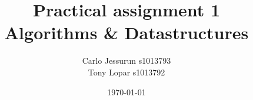 \documentclass{article}
\begin{document}
\title{Practical assignment 1 \\ Algorithms \& Datastructures}
\author{Carlo Jessurun s1013793 \\ Tony Lopar s1013792}
\date{\today}
\maketitle
\end{document}

